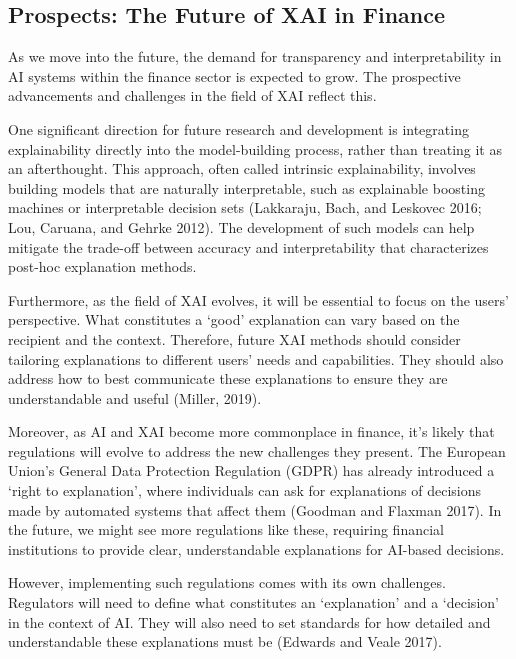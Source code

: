 \documentclass[
  letterpaper,
  DIV=11,
  numbers=noendperiod]{scrartcl}
\begin{document}
\hypertarget{prospects-the-future-of-xai-in-finance}{%
\subsection{Prospects: The Future of XAI in
Finance}\label{prospects-the-future-of-xai-in-finance}}

As we move into the future, the demand for transparency and
interpretability in AI systems within the finance sector is expected to
grow. The prospective advancements and challenges in the field of XAI
reflect this.

One significant direction for future research and development is
integrating explainability directly into the model-building process,
rather than treating it as an afterthought. This approach, often called
intrinsic explainability, involves building models that are naturally
interpretable, such as explainable boosting machines or interpretable
decision sets (Lakkaraju, Bach, and Leskovec 2016; Lou, Caruana, and
Gehrke 2012). The development of such models can help mitigate the
trade-off between accuracy and interpretability that characterizes
post-hoc explanation methods.

Furthermore, as the field of XAI evolves, it will be essential to focus
on the users' perspective. What constitutes a `good' explanation can
vary based on the recipient and the context. Therefore, future XAI
methods should consider tailoring explanations to different users' needs
and capabilities. They should also address how to best communicate these
explanations to ensure they are understandable and useful (Miller,
2019).

Moreover, as AI and XAI become more commonplace in finance, it's likely
that regulations will evolve to address the new challenges they present.
The European Union's General Data Protection Regulation (GDPR) has
already introduced a `right to explanation', where individuals can ask
for explanations of decisions made by automated systems that affect them
(Goodman and Flaxman 2017). In the future, we might see more regulations
like these, requiring financial institutions to provide clear,
understandable explanations for AI-based decisions.

However, implementing such regulations comes with its own challenges.
Regulators will need to define what constitutes an `explanation' and a
`decision' in the context of AI. They will also need to set standards
for how detailed and understandable these explanations must be (Edwards
and Veale 2017).
\end{document}

